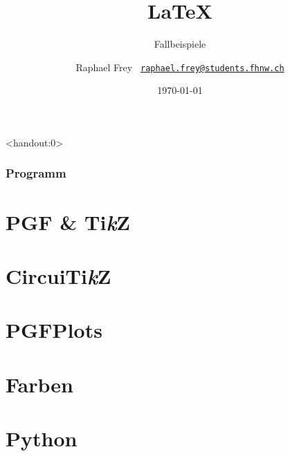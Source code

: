 \documentclass{beamer}                %
\title{\vspace*{4em}\Huge\LaTeX}
\subtitle{\hfill Fallbeispiele}
\date{\today}
\author{%
    Raphael Frey%
    \hfill%
    \scriptsize\texttt{%
        \href{mailto:raphael.frey@students.fhnw.ch}%
        {raphael.frey@students.fhnw.ch}}}
\def\TikZ{Ti\emph{k}Z}
\begin{document}
                                                              

\frame[plain]{\titlepage} %


\begin{frame}<handout:0> %
    \frametitle{Programm}
    \tableofcontents
\end{frame}


\section<handout:0>{PGF \& \TikZ} %

\section<handout:0>{Circui\TikZ} %

\section<handout:0>{PGFPlots} %

\section<handout:0>{Farben} %

\section<handout:0>{Python} %
\end{document}

